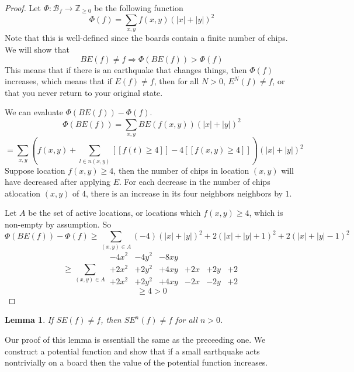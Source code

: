 \documentclass[11pt]{article}
\newtheorem{lemma}{Lemma}
\begin{document}
\begin{proof}
Let $\Phi: \mathcal{B}_f \rightarrow \mathbb{Z}_{\geq 0}$ be the following function
\[ \Phi(f) = \sum_{x,y} f(x,y)(|x|+|y|)^2 \]
Note that this is well-defined since the boards contain a finite number of chips. We will show that 
\[ BE(f) \neq f \Rightarrow \Phi(BE(f)) > \Phi(f) \]
This means that if there is an earthquake that changes things, then $\Phi(f)$ increases, which means that if $E(f) \neq f$, then for all $N > 0$, $E^N(f) \neq f$, or that you never return to your original state.

We can evaluate $\Phi(BE(f)) - \Phi(f)$.
\[ \Phi(BE(f)) = \sum_{x,y} BE(f(x,y)) (|x|+|y|)^2 \]
\[ = \sum_{x,y} \left(f(x,y) + \sum_{l \in n(x,y)} [[f(t) \geq 4]] - 4[[f(x,y) \geq 4]]\right) (|x|+|y|)^2 \]
Suppose location $f(x,y) \geq 4$, then the number of chips in location $(x,y)$ will have decreased after applying $E$. For each decrease in the number of chips atlocation $(x,y)$ of $4$, there is an increase in its four neighbors neighbors by $1$. 

Let $A$ be the set of active locations, or locations which $f(x,y) \geq 4$, which is non-empty by assumption. 
So
\[ \Phi(BE(f)) - \Phi(f) \geq \sum_{(x,y) \in A} (-4)(|x|+|y|)^2 + 2(|x|+|y|+1)^2 + 2(|x|+|y|-1)^2 \]
\[ \geq \sum_{(x,y) \in A} \begin{array}{cccccc} -4x^2 & -4y^2 & -8xy & & &\\
									   +2x^2 & +2y^2 & +4xy & +2x& +2y &+ 2\\
									   +2x^2 & +2y^2 & +4xy & -2x& -2y  & +2 \end{array} \]
\[ \geq 4 > 0 \] 
\end{proof}

\begin{lemma}
If $SE(f) \neq f$, then $SE^n(f) \neq f$ for all $n > 0$.
\end{lemma}
Our proof of this lemma is essentiall the same as the preceeding one. We construct a potential function and show that if a small earthquake acts nontrivially on a board then the value of the potential function increases. 
\end{document}
